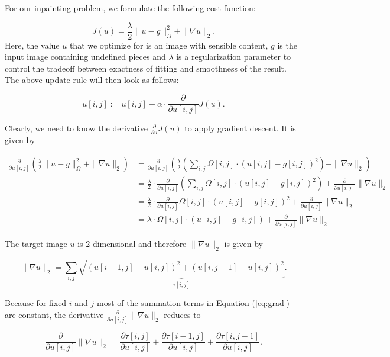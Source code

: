\documentclass{paper}
\begin{document}
\noindent For our inpainting problem, we formulate the following cost function:


$$J(u) = \frac{\lambda}{2} \|u-g\|_\Omega^2 + \|\nabla u \|_2.$$
Here, the value $u$ that we optimize for is an image with sensible content, $g$ is the input image containing undefined pieces and $\lambda$ is a regularization parameter to control the tradeoff between exactness of fitting and smoothness of the result. The above update rule will then look as follows:

$$ u[i,j] := u[i,j] - \alpha \cdot \frac{\partial}{\partial u[i,j]} J(u).$$

Clearly, we need to know the derivative $\frac{\partial}{\partial u} J(u)$ to apply gradient descent. It is given by

\begin{align*}
 \frac{\partial}{\partial u[i,j]} \left( \frac{\lambda}{2} \|u-g\|_\Omega^2 + \|\nabla u\|_2 \right) &= \frac{\partial}{\partial u[i,j]} \left( \frac{\lambda}{2} \left(\sum_{i,j} \Omega[i,j] \cdot (u[i,j] - g[i,j])^2\right) + \|\nabla u\|_2 \right) \\
&= \frac{\lambda}{2} \cdot \frac{\partial}{\partial u[i,j]} \left(\sum_{i,j} \Omega[i,j] \cdot (u[i,j] - g[i,j])^2\right) + \frac{\partial}{\partial u[i,j]} \|\nabla u \|_2 \\
%
&= \frac{\lambda}{2} \cdot \frac{\partial}{\partial u[i,j]} \Omega[i,j] \cdot (u[i,j] - g[i,j])^2 + \frac{\partial}{\partial u[i,j]} \|\nabla u \|_2 \\
%
&= \lambda \cdot \Omega[i,j] \cdot (u[i,j] - g[i,j]) + \frac{\partial}{\partial u[i,j]} \|\nabla u \|_2 
\end{align*}

The target image $u$ is 2-dimensional and therefore $\|\nabla u \|_2$ is given by

\begin{equation} \|\nabla u \|_2 = \sum_{i,j} \underbrace{\sqrt{(u[i+1,j] - u [i,j])^2 + (u[i,j+1] - u[i,j])^2}}_{\tau[i,j]}.
 \label{eq:grad}
\end{equation}

Because for fixed $i$ and $j$ most of the summation terms in Equation (\ref{eq:grad}) are constant, the derivative $\frac{\partial}{\partial u[i,j]} \|\nabla u \|_2$ reduces to

$$\frac{\partial}{\partial u[i,j]} \|\nabla u \|_2 = \frac{\partial \tau[i,j]}{\partial u[i,j]} + \frac{\partial \tau[i-1,j]}{\partial u[i,j]} + \frac{\partial \tau[i,j-1]}{\partial u[i,j]}.$$
\end{document}
